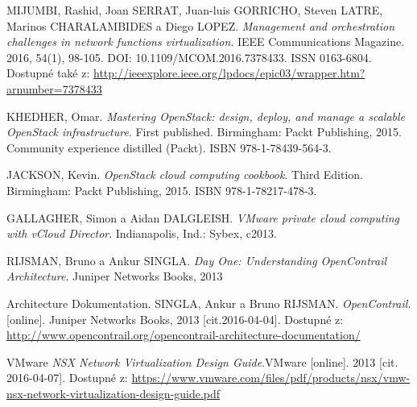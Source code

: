 \begin{thebibliography}{10}
MIJUMBI, Rashid, Joan SERRAT, Juan-luis GORRICHO, Steven LATRE, Marinos CHARALAMBIDES a Diego LOPEZ. \emph{Management and orchestration challenges in network functions virtualization}. IEEE Communications Magazine. 2016, 54(1), 98-105. DOI: 10.1109/MCOM.2016.7378433. ISSN 0163-6804. Dostupné také z: \url{http://ieeexplore.ieee.org/lpdocs/epic03/wrapper.htm?arnumber=7378433}

 KHEDHER, Omar. \emph{Mastering OpenStack: design, deploy, and manage a scalable OpenStack infrastructure}. First published. Birmingham: Packt Publishing, 2015. Community experience distilled (Packt). ISBN 978-1-78439-564-3.

JACKSON, Kevin. \emph{OpenStack cloud computing cookbook}. Third Edition. Birmingham: Packt Publishing, 2015. ISBN 978-1-78217-478-3.

GALLAGHER, Simon a Aidan DALGLEISH. \emph{VMware private cloud computing with vCloud Director}. Indianapolis, Ind.: Sybex, c2013.

 RIJSMAN, Bruno a Ankur SINGLA. \emph{Day One: Understanding OpenContrail Architecture}. Juniper Networks Books, 2013

 Architecture   Dokumentation.   SINGLA,   Ankur   a   Bruno   RIJSMAN. \emph{OpenContrail}. [online].  Juniper  Networks  Books,   2013  [cit.2016-04-04]. Dostupné    z: \url{http://www.opencontrail.org/opencontrail-architecture-documentation/}

VMware \emph{NSX Network Virtualization Design Guide}.VMware [online]. 2013 [cit. 2016-04-07]. Dostupné z: \url{https://www.vmware.com/files/pdf/products/nsx/vmw-nsx-network-virtualization-design-guide.pdf}








\end{thebibliography}